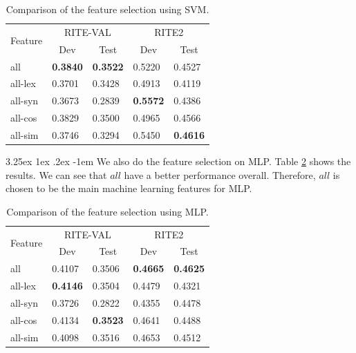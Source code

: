 \documentclass[12pt]{article}
\makeatletter
\renewcommand\paragraph{\@startsection{paragraph}{5}{\z@}%
  {3.25ex \@plus1ex \@minus.2ex}%
  {-1em}%
  {\normalfont\normalsize\bfseries}}
\makeatother
\begin{document}
\begin{CJK*}{UTF8}{bkai}
\begin{spacing}{1.77}
\begin{table}[H]
  \centering
  \setlength{\extrarowheight}{-3pt}
  \caption{Comparison of the feature selection using SVM.}
  \label{result:ft_select}
  \begin{tabular}{|l|l|l|l|l|}
  \hline
  \multicolumn{1}{|c|}{\multirow{2}{*}{Feature}} & \multicolumn{2}{c|}{RITE-VAL} & \multicolumn{2}{c|}{RITE2} \\ \cline{2-5}
  \multicolumn{1}{|c|}{} & \multicolumn{1}{c|}{Dev} & \multicolumn{1}{c|}{Test} & \multicolumn{1}{c|}{Dev} & \multicolumn{1}{c|}{Test} \\ \hline
  all & \textbf{0.3840} & \textbf{0.3522} & 0.5220 & 0.4527 \\ \hline
  all-lex & 0.3701 & 0.3428 & 0.4913 & 0.4119 \\ \hline
  all-syn & 0.3673 & 0.2839 & \textbf{0.5572} & 0.4386 \\ \hline
  all-cos & 0.3829 & 0.3500 & 0.4965 & 0.4566 \\ \hline
  all-sim & 0.3746 & 0.3294 & 0.5450 & \textbf{0.4616} \\ \hline
  \end{tabular}
\end{table}

\paragraph{}
We also do the feature selection on MLP. Table \ref{result:ft_select_mlp} shows the results. We can see that $all$ have a better performance overall. Therefore, $all$ is chosen to be the main machine learning features for MLP.

\begin{table}[H]
  \centering
  \setlength{\extrarowheight}{-3pt}
  \caption{Comparison of the feature selection using MLP.}
  \label{result:ft_select_mlp}
  \begin{tabular}{|l|l|l|l|l|}
  \hline
  \multicolumn{1}{|c|}{\multirow{2}{*}{Feature}} & \multicolumn{2}{c|}{RITE-VAL} & \multicolumn{2}{c|}{RITE2} \\ \cline{2-5}
  \multicolumn{1}{|c|}{} & \multicolumn{1}{c|}{Dev} & \multicolumn{1}{c|}{Test} & \multicolumn{1}{c|}{Dev} & \multicolumn{1}{c|}{Test} \\ \hline
  all & 0.4107 & 0.3506 & \textbf{0.4665} & \textbf{0.4625} \\ \hline
  all-lex & \textbf{0.4146} & 0.3504 & 0.4479 & 0.4321 \\ \hline
  all-syn & 0.3726 & 0.2822 & 0.4355 & 0.4478 \\ \hline
  all-cos & 0.4134 & \textbf{0.3523} & 0.4641 & 0.4488 \\ \hline
  all-sim & 0.4098 & 0.3516 & 0.4653 & 0.4512 \\ \hline
  \end{tabular}
\end{table}


\end{spacing}
\end{CJK*}
\end{document}
